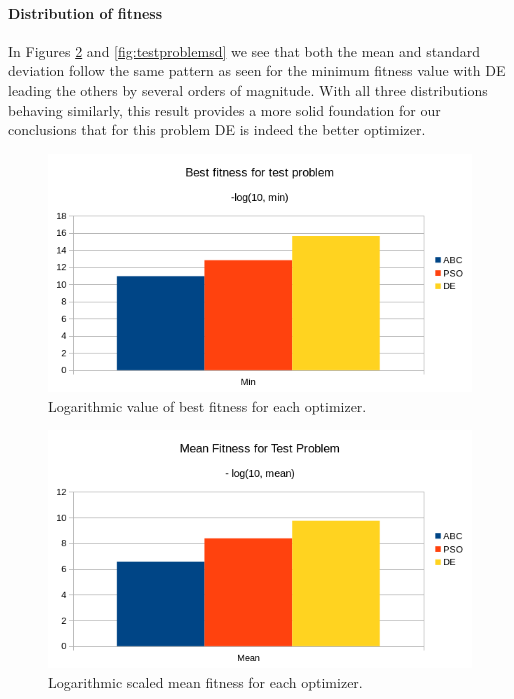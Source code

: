\paragraph{Distribution of fitness}
In Figures \ref{fig:testproblemmean} and \ref{fig:testproblemsd} we see that both the mean and standard deviation follow the same pattern as seen for the minimum fitness value with DE leading the others by several orders of magnitude. With all three distributions behaving similarly, this result provides a more solid foundation for our conclusions that for this problem DE is indeed the better optimizer.
\begin{figure}
    \centering
    \includegraphics[width=\textwidth,height=\textheight,keepaspectratio]{figures/testproblem_bestfitness.png}
    \caption{Logarithmic value of best fitness for each optimizer.}
    \label{fig:testproblembest}
\end{figure}
\begin{figure}
    \centering
    \includegraphics[width=\textwidth,height=\textheight,keepaspectratio]{figures/testproblem_meanfitness.png}
    \caption{Logarithmic scaled mean fitness for each optimizer.}
    \label{fig:testproblemmean}
\end{figure}
